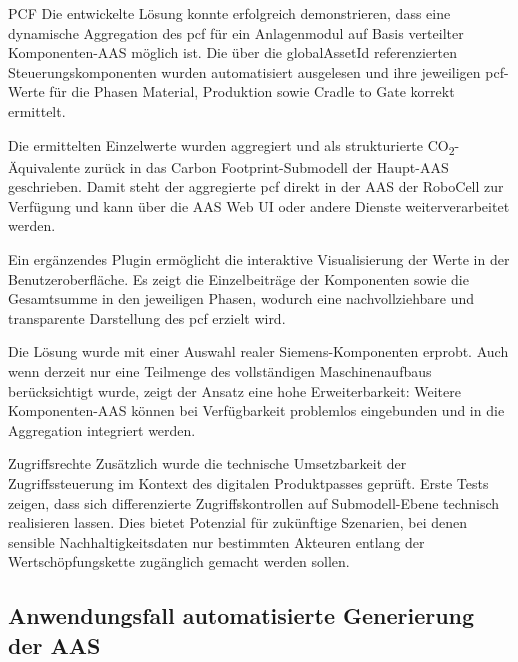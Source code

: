 PCF
Die entwickelte Lösung konnte erfolgreich demonstrieren, dass eine dynamische Aggregation des \acs{pcf} für ein Anlagenmodul auf Basis verteilter Komponenten-AAS möglich ist. Die über die globalAssetId referenzierten Steuerungskomponenten wurden automatisiert ausgelesen und ihre jeweiligen \acs{pcf}-Werte für die Phasen Material, Produktion sowie Cradle to Gate korrekt ermittelt.

Die ermittelten Einzelwerte wurden aggregiert und als strukturierte CO\textsubscript{2}-Äquivalente zurück in das Carbon Footprint-Submodell der Haupt-AAS geschrieben. Damit steht der aggregierte \acs{pcf} direkt in der AAS der RoboCell zur Verfügung und kann über die AAS Web UI oder andere Dienste weiterverarbeitet werden.

Ein ergänzendes Plugin ermöglicht die interaktive Visualisierung der Werte in der Benutzeroberfläche. Es zeigt die Einzelbeiträge der Komponenten sowie die Gesamtsumme in den jeweiligen Phasen, wodurch eine nachvollziehbare und transparente Darstellung des \acs{pcf} erzielt wird.

Die Lösung wurde mit einer Auswahl realer Siemens-Komponenten erprobt. Auch wenn derzeit nur eine Teilmenge des vollständigen Maschinenaufbaus berücksichtigt wurde, zeigt der Ansatz eine hohe Erweiterbarkeit: Weitere Komponenten-AAS können bei Verfügbarkeit problemlos eingebunden und in die Aggregation integriert werden.

Zugriffsrechte
Zusätzlich wurde die technische Umsetzbarkeit der Zugriffssteuerung im Kontext des digitalen Produktpasses geprüft. Erste Tests zeigen, dass sich differenzierte Zugriffskontrollen auf Submodell-Ebene technisch realisieren lassen. Dies bietet Potenzial für zukünftige Szenarien, bei denen sensible Nachhaltigkeitsdaten nur bestimmten Akteuren entlang der Wertschöpfungskette zugänglich gemacht werden sollen.

\subsection{Anwendungsfall automatisierte Generierung der AAS}

